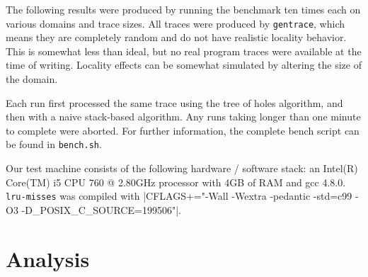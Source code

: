 \documentclass[a4paper,10pt]{article}
\begin{document}
The following results were produced by running the benchmark ten times each
on various domains and trace sizes. All traces were produced by \verb|gentrace|, which means
they are completely random and do not have realistic locality behavior. This is somewhat
less than ideal, but no real program traces were available at the time of writing.
Locality effects can be somewhat simulated by altering the size of the domain.

Each run first processed the same trace using the tree of holes algorithm, and then
with a naive stack-based algorithm.
Any runs taking longer than one minute to complete
were aborted. For further information, the complete bench script can be found in
\verb|bench.sh|.

Our test machine consists of the following hardware / software stack: an Intel(R) Core(TM) i5 CPU 760 @ 2.80GHz
processor with 4GB of RAM and gcc 4.8.0. \verb|lru-misses| was compiled with \spverb|CFLAGS+="-Wall -Wextra -pedantic -std=c99 -O3 -D_POSIX_C_SOURCE=199506"|.


\begin{comment}
We chose the format a little unwisely. Convert it into CSV which we can use:

$ echo m, n, algorithm, seconds > ~/tmp.csv
$ awk '/^[0-9]/ { m = $1; n = $2; } /^[^0-9]/ { print m, n, $0 }' bench_results | cut -d' ' -f1-4 | sed 's/://' | sed 's/ /, /g' >> ~/tmp.csv

in R:

mydata = read.csv("~/tmp.csv")
mins <- aggregate(seconds ~ m +  n + algorithm, data = mydata, FUN = min)

plot(log2(mins$n), mins$seconds, type="n")

for(alg in c("itree", "naive")) {
  for(i in c(1024, 65536, 4194304)) {
    ss <- subset(mydata, grepl(alg, algorithm) & m == i)
    sm <- aggregate(seconds ~ m +  n + algorithm, data = ss, FUN = min)
    jpeg(paste(alg, i, ".jpg", sep = "_"))
    plot(log2(sm$n), log10(sm$seconds))
    dev.off()
  }
}

\end{comment}



\section{Analysis}
\end{document}
